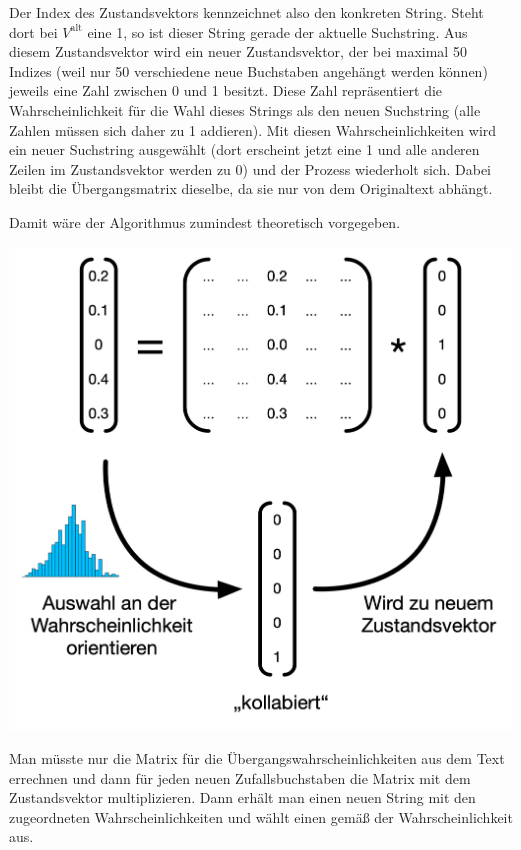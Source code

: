 \documentclass[paper=a4,notitlepage,parskip=half,plainheadsepline]{scrartcl}
\begin{document}
\begin{minipage}[t]{0.5\textwidth}
\vspace{0pt}
Der Index des Zustandsvektors kennzeichnet also den konkreten String. Steht dort bei $V^\mathrm{alt}$ eine 1, so ist dieser String gerade der aktuelle Suchstring. Aus diesem Zustandsvektor wird ein neuer Zustandsvektor, der bei maximal 50 Indizes (weil nur 50 verschiedene neue Buchstaben angehängt werden können) jeweils eine Zahl zwischen 0 und 1 besitzt. Diese Zahl repräsentiert die Wahrscheinlichkeit für die Wahl dieses Strings als den neuen Suchstring (alle Zahlen müssen sich daher zu 1 addieren). Mit diesen Wahrscheinlichkeiten wird ein neuer Suchstring ausgewählt (dort erscheint jetzt eine 1 und alle anderen Zeilen im Zustandsvektor werden zu 0) und der Prozess wiederholt sich. Dabei bleibt die Übergangsmatrix dieselbe, da sie nur von dem Originaltext abhängt.

Damit wäre der Algorithmus zumindest theoretisch vorgegeben.
\end{minipage}
\hfill
\begin{minipage}[t]{0.5\textwidth}
\vspace{0pt}
\centering
\includegraphics[width=1\textwidth]{FuerAufgabe02.png}
\end{minipage}

Man müsste nur die Matrix für die Übergangswahrscheinlichkeiten aus dem Text errechnen und dann für jeden neuen Zufallsbuchstaben die Matrix mit dem Zustandsvektor multiplizieren. Dann erhält man einen neuen String mit den zugeordneten Wahrscheinlichkeiten und wählt einen gemäß der Wahrscheinlichkeit aus.
\end{document}
